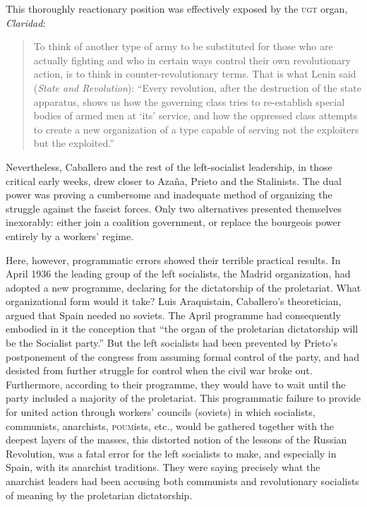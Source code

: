 This thoroughly reactionary position was effectively exposed by the \textsc{ugt} organ, \emph{Claridad}:
\begin{quote}
  To think of another type of army to be substituted for those who are actually fighting and who in certain ways control their own revolutionary action, is to think in counter-revolutionary terms. That is what Lenin said (\emph{State and Revolution}): ``Every revolution, after the destruction of the state apparatus, shows us how the governing class tries to re-establish special bodies of armed men at `its' service, and how the oppressed class attempts to create a new organization of a type capable of serving not the exploiters but the exploited.''
\end{quote}
Nevertheless, Caballero and the rest of the left-socialist leadership, in those critical early weeks, drew closer to Azaña, Prieto and the Stalinists. The dual power was proving a cumbersome and inadequate method of organizing the struggle against the fascist forces. Only two alternatives presented themselves inexorably: either join a coalition government, or replace the bourgeois power entirely by a workers’ regime.

Here, however, programmatic errors showed their terrible practical results. In April 1936 the leading group of the left socialists, the Madrid organization, had adopted a new programme, declaring for the dictatorship of the proletariat. What organizational form would it take? Luis Araquistain, Caballero’s theoretician, argued that Spain needed no soviets. The April programme had consequently embodied in it the conception that ``the organ of the proletarian dictatorship will be the Socialist party.'' But the left socialists had been prevented by Prieto’s postponement of the congress from assuming formal control of the party, and had desisted from further struggle for control when the civil war broke out. Furthermore, according to their programme, they would have to wait until the party included a majority of the proletariat. This programmatic failure to provide for united action through workers’ councils (soviets) in which socialists, communists, anarchists, \textsc{poum}ists, etc., would be gathered together with the deepest layers of the masses, this distorted notion of the lessons of the Russian Revolution, was a fatal error for the left socialists to make, and especially in Spain, with its anarchist traditions. They were saying precisely what the anarchist leaders had been accusing both communists and revolutionary socialists of meaning by the proletarian dictatorship.

